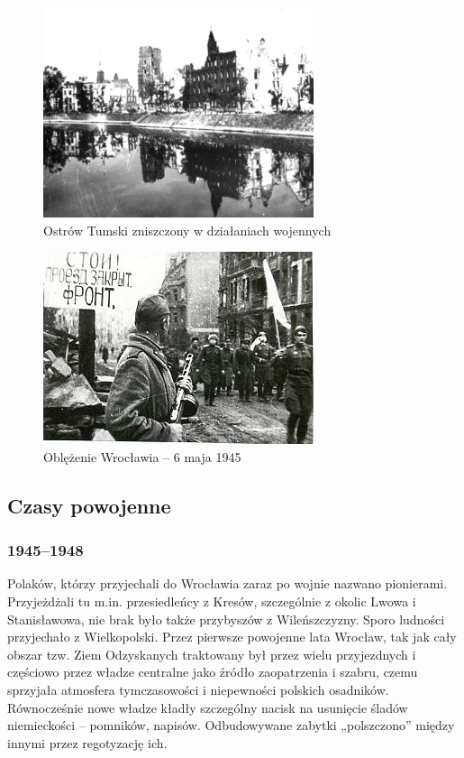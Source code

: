 \documentclass{article}
\begin{document}
\begin{figure}[htbp!]
\centering
\includegraphics[scale=1.0]{12.png}
\caption{Ostrów Tumski zniszczony w działaniach wojennych}
\label{fig:12}
\end{figure}

\begin{figure}[htbp!]
\centering
\includegraphics[scale=3.0]{13.jpg}
\caption{Oblężenie Wrocławia – 6 maja 1945}
\label{fig:13}
\end{figure}

\subsection{Czasy powojenne}
\subsubsection{1945–1948}

Polaków, którzy przyjechali do Wrocławia zaraz po wojnie nazwano pionierami. Przyjeżdżali tu m.in. przesiedleńcy z Kresów, szczególnie z okolic Lwowa i Stanisławowa, nie brak było także przybyszów z Wileńszczyzny. Sporo ludności przyjechało z Wielkopolski. Przez pierwsze powojenne lata Wrocław, tak jak cały obszar tzw. Ziem Odzyskanych traktowany był przez wielu przyjezdnych i częściowo przez władze centralne jako źródło zaopatrzenia i szabru, czemu sprzyjała atmosfera tymczasowości i niepewności polskich osadników. Równocześnie nowe władze kładły szczególny nacisk na usunięcie śladów niemieckości – pomników, napisów. Odbudowywane zabytki „polszczono” między innymi przez regotyzację ich.
\end{document}
